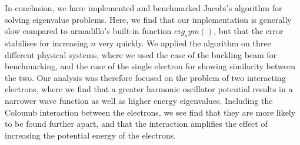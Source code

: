 In conclusion, we have implemented and benchmarked Jacobi's algorithm for solving eigenvalue problems.
Here, we find that our implementation is generally slow compared to armadillo's built-in function $eig_sym()$,
but that the error stabilises for increasing $n$ very quickly.
We applied the algorithm on three different physical systems, where we used the case
of the buckling beam for benchmarking, and the case of the single electron for
showing similarity between the two. Our analysis was therefore focused on the problem
of two interacting electrons, where we find that a greater harmonic oscillator potential
results in a narrower wave function as well as higher energy eigenvalues. Including
the Coloumb interaction between the electrons, we see find that they are more likely to be
found further apart, and that the interaction amplifies the effect of increasing
the potential energy of the electrons.
